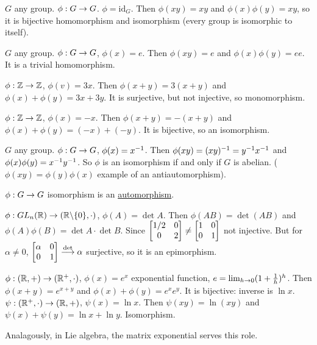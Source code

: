 \documentclass[]{article}
\begin{document}
\begin{example}
	$G$ any group. $\phi: G\rightarrow G$. $\phi = \text{id}_G$. Then $\phi(xy) = xy$ and $\phi(x)\phi(y) = xy$, so it is bijective homomorphism and isomorphism (every group is isomorphic to itself).
\end{example}
\begin{example}
	$G$ any group. $\phi:G\rightarrow G$, $\phi(x) = e$. Then $\phi(xy) = e$ and $\phi(x)\phi(y) = ee$. It is a trivial homomorphism.
\end{example}
\begin{example}
	$\phi:\mathbb{Z}\rightarrow\mathbb{Z}$, $\phi(v) = 3x$. Then $\phi(x+y) = 3(x+y)$ and $\phi(x)+\phi(y) = 3x+3y$. It is surjective, but not injective, so monomorphism.
\end{example}
\begin{example}
	$\phi:\mathbb{Z}\rightarrow\mathbb{Z}$, $\phi(x) = -x$. Then $\phi(x+y) = -(x+y)$ and $\phi(x)+\phi(y) = (-x)+(-y)$. It is bijective, so an isomorphism.
\end{example}
\begin{example}
	$G$ any group. $\phi:G\rightarrow G$, $\phi(x) = x^{-1}$. Then $\phi(xy) = (xy)^{-1} = y^{-1} x^{-1}$ and $\phi(x)\phi(y) = x^{-1} y^{-1}$. So $\phi$ is an isomorphism if and only if $G$ is abelian. ($\phi(xy) = \phi(y)\phi(x)$ example of an antiautomorphism).
\end{example}
\begin{definition}
	$\phi: G\rightarrow G$ isomorphism is an \ul{automorphism}.
\end{definition}
\begin{example}
	$\phi: GL_n(\mathbb{R})\rightarrow(\mathbb{R}\backslash\{0\},\cdot)$, $\phi(A) = \det A$. Then $\phi(AB) = \det(AB)$ and $\phi(A)\phi(B) = \det A \cdot \det B$. Since $\begin{bmatrix}1/2 & 0 \\ 0 & 2\end{bmatrix} \neq \begin{bmatrix}1&0\\0&1\end{bmatrix}$ not injective. But for $\alpha\neq 0$, $\begin{bmatrix}\alpha &0 \\ 0 & 1\end{bmatrix} \overset{\det}{\longrightarrow} \alpha$ surjective, so it is an epimorphism.
\end{example}
\begin{example}
	$\phi: (\mathbb{R},+)\rightarrow (\mathbb{R}^+,\cdot)$, $\phi(x) = e^x$ exponential function, $e = \lim_{h\rightarrow 0}(1+\frac{1}{h})^h$.
	Then $\phi(x+y) = e^{x+y}$ and $\phi(x)+\phi(y) = e^xe^y$. It is bijective: inverse is $\ln x$. $\psi:(\mathbb{R}^+,\cdot)\rightarrow(\mathbb{R},+)$, $\psi(x) = \ln x$.
	Then $\psi(xy) = \ln(xy)$ and $\psi(x)+\psi(y) = \ln x + \ln y$. Isomorphism.
\end{example}
\begin{remark}
	Analagously, in Lie algebra, the matrix exponential serves this role.
\end{remark}
\end{document}
